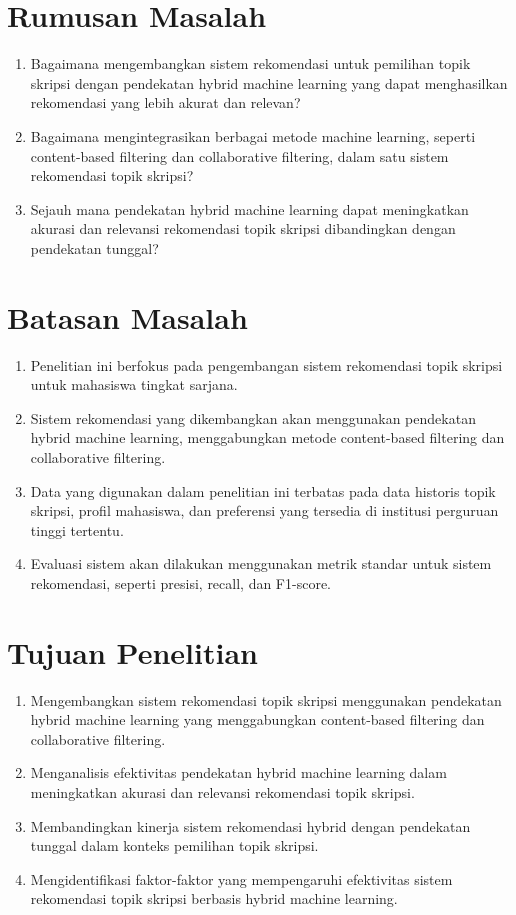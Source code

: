 \section{Rumusan Masalah}
    \begin{enumerate}
        \item Bagaimana mengembangkan sistem rekomendasi untuk pemilihan topik skripsi dengan pendekatan hybrid machine learning yang dapat menghasilkan rekomendasi yang lebih akurat dan relevan?
        \item Bagaimana mengintegrasikan berbagai metode machine learning, seperti content-based filtering dan collaborative filtering, dalam satu sistem rekomendasi topik skripsi?
        \item Sejauh mana pendekatan hybrid machine learning dapat meningkatkan akurasi dan relevansi rekomendasi topik skripsi dibandingkan dengan pendekatan tunggal?
    \end{enumerate}

\section{Batasan Masalah}
    \begin{enumerate}
        \item Penelitian ini berfokus pada pengembangan sistem rekomendasi topik skripsi untuk mahasiswa tingkat sarjana.
        \item Sistem rekomendasi yang dikembangkan akan menggunakan pendekatan hybrid machine learning, menggabungkan metode content-based filtering dan collaborative filtering.
        \item Data yang digunakan dalam penelitian ini terbatas pada data historis topik skripsi, profil mahasiswa, dan preferensi yang tersedia di institusi perguruan tinggi tertentu.
        \item Evaluasi sistem akan dilakukan menggunakan metrik standar untuk sistem rekomendasi, seperti presisi, recall, dan F1-score.
    \end{enumerate}

\section{Tujuan Penelitian}
    \begin{enumerate}
        \item Mengembangkan sistem rekomendasi topik skripsi menggunakan pendekatan hybrid machine learning yang menggabungkan content-based filtering dan collaborative filtering.
        \item Menganalisis efektivitas pendekatan hybrid machine learning dalam meningkatkan akurasi dan relevansi rekomendasi topik skripsi.
        \item Membandingkan kinerja sistem rekomendasi hybrid dengan pendekatan tunggal dalam konteks pemilihan topik skripsi.
        \item Mengidentifikasi faktor-faktor yang mempengaruhi efektivitas sistem rekomendasi topik skripsi berbasis hybrid machine learning.
    \end{enumerate}

